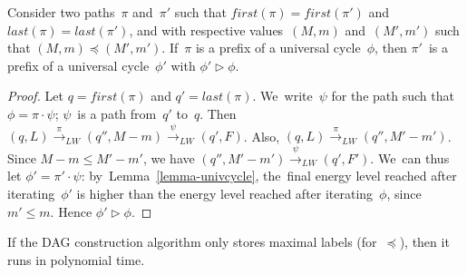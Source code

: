 Consider two paths~$\pi$ and~$\pi'$ such that
$first(\pi)=first(\pi')$ and $last(\pi)=last(\pi')$, and with
respective values~$(M,m)$ and~$(M',m')$ such that $(M,m)\preceq (M',m')$.
If~$\pi$ is a prefix of a universal cycle~$\phi$, then $\pi'$~is a
prefix of a universal cycle~$\phi'$ with $\phi'\triangleright\phi$.

\begin{proof}
  Let $q=first(\pi)$ and $q'=last(\pi)$.  We~write~$\psi$ for the
  path such that $\phi=\pi\cdot\psi$; $\psi$~is a path from~$q'$
  to~$q$. Then $(q,L)\xrightarrow{\pi}_{LW} (q'',M-m)
  \xrightarrow{\psi}_{LW}(q',F)$. Also, $(q,L)\xrightarrow{\pi}_{LW} (q'',M'-m')$.  Since
  $M-m\leq M'-m'$, we have $(q'',M'-m')\xrightarrow{\psi}_{LW}(q',F')$. We~can
  thus let $\phi'=\pi'\cdot\psi$: by~Lemma~\ref{lemma-univcycle},
  the~final energy level reached after iterating~$\phi'$ is higher
  than the energy level reached after iterating~$\phi$, since $m'\leq
  m$. Hence $\phi'\triangleright\phi$.
\end{proof}



If the DAG construction algorithm only stores maximal labels (for~$\preceq$), then
it runs in polynomial time.

